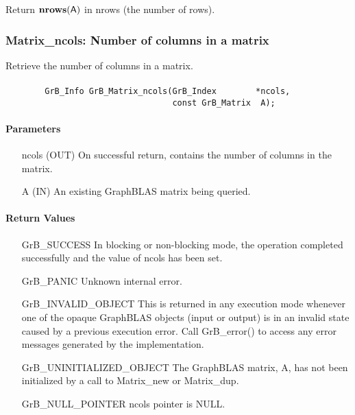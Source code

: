 Return $\mathbf{nrows}({\sf A})$ in {\sf nrows} (the number of rows).

\subsubsection{{\sf Matrix\_ncols}: Number of columns in a matrix}

Retrieve the number of columns in a matrix.

\paragraph{\syntax}

\begin{verbatim}
        GrB_Info GrB_Matrix_ncols(GrB_Index        *ncols,
                                  const GrB_Matrix  A);
\end{verbatim}

\paragraph{Parameters}

\begin{itemize}[leftmargin=1.1in]
    \item[{\sf ncols}] ({\sf OUT}) On successful return, contains the number of columns in the matrix.
    \item[{\sf A}] ({\sf IN}) An existing GraphBLAS matrix being queried.
\end{itemize}

\paragraph{Return Values}

\begin{itemize}[leftmargin=2.1in]
    \item[{\sf GrB\_SUCCESS}]   In blocking or non-blocking mode, the operation 
    completed successfully and the value of {\sf ncols} has been set.

    \item[{\sf GrB\_PANIC}]     Unknown internal error.
    
    \item[{\sf GrB\_INVALID\_OBJECT}] This is returned in any execution mode 
    whenever one of the opaque GraphBLAS objects (input or output) is in an invalid 
    state caused by a previous execution error.  Call {\sf GrB\_error()} to access 
    any error messages generated by the implementation.

    \item[{\sf GrB\_UNINITIALIZED\_OBJECT}]  The GraphBLAS matrix, {\sf A}, has 
    not been initialized by a call to {\sf Matrix\_new} or {\sf Matrix\_dup}.
    
    \item[{\sf GrB\_NULL\_POINTER}]  {\sf ncols} pointer is {\sf NULL}.
\end{itemize}

